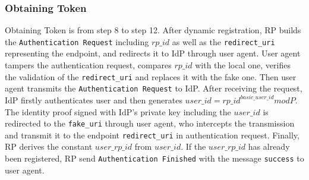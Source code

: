 \subsubsection{Obtaining Token}
Obtaining Token is from step 8 to step 12. After dynamic registration,  RP builds the \verb+Authentication Request+ including $rp\_id$ as well as the \verb+redirect_uri+ representing the endpoint, and redirects it to IdP through user agent. User agent tampers the authentication request, compares $rp\_id$ with the local one, verifies the validation of the \verb+redirect_uri+ and replaces it with the fake one. Then user agent transmits the \verb+Authentication Request+ to IdP. After receiving the request, IdP firstly authenticates user and then generates $user\_id=rp\_id^{basic\_user\_id}modP$. The identity proof signed with IdP's private key including the $user\_id$ is redirected to the \verb+fake_uri+ through user agent, who intercepts the transmission and transmit it to the endpoint \verb+redirect_uri+ in authentication request. Finally, RP derives the constant $user\_rp\_id$ from $user\_id$. If the $user\_rp\_id$ has already been registered, RP send \verb+Authentication Finished+ with the message \verb+success+ to user agent.


